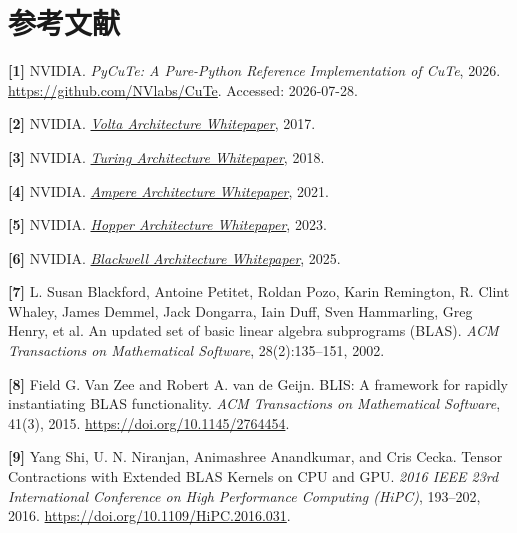\section*{参考文献}

\noindent\textbf{[1]} NVIDIA. \emph{PyCuTe: A Pure-Python Reference Implementation of CuTe}, 2026.
\url{https://github.com/NVlabs/CuTe}. Accessed: 2026-07-28.

\noindent\textbf{[2]} NVIDIA. \href{https://images.nvidia.com/content/volta-architecture/pdf/volta-architecture-whitepaper.pdf}{\emph{Volta Architecture Whitepaper}}, 2017.

\noindent\textbf{[3]} NVIDIA. \href{https://images.nvidia.com/aem-dam/en-zz/Solutions/design-visualization/technologies/turing-architecture/NVIDIA-Turing-Architecture-Whitepaper.pdf}{\emph{Turing Architecture Whitepaper}}, 2018.

\noindent\textbf{[4]} NVIDIA. \href{https://images.nvidia.com/aem-dam/en-zz/Solutions/data-center/nvidia-ampere-architecture-whitepaper.pdf}{\emph{Ampere Architecture Whitepaper}}, 2021.

\noindent\textbf{[5]} NVIDIA. \href{https://resources.nvidia.com/en-us-hopper-architecture/nvidia-h100-tensor-c}{\emph{Hopper Architecture Whitepaper}}, 2023.

\noindent\textbf{[6]} NVIDIA. \href{https://images.nvidia.com/aem-dam/Solutions/geforce/blackwell/nvidia-rtx-blackwell-gpu-architecture.pdf}{\emph{Blackwell Architecture Whitepaper}}, 2025.

\noindent\textbf{[7]} L. Susan Blackford, Antoine Petitet, Roldan Pozo, Karin Remington,
R. Clint Whaley, James Demmel, Jack Dongarra, Iain Duff, Sven Hammarling,
Greg Henry, et al. An updated set of basic linear algebra subprograms (BLAS).
\emph{ACM Transactions on Mathematical Software}, 28(2):135--151, 2002.

\noindent\textbf{[8]} Field G. Van Zee and Robert A. van de Geijn. BLIS: A framework for rapidly
instantiating BLAS functionality. \emph{ACM Transactions on Mathematical Software},
41(3), 2015. \url{https://doi.org/10.1145/2764454}.

\noindent\textbf{[9]} Yang Shi, U. N. Niranjan, Animashree Anandkumar, and Cris Cecka.
Tensor Contractions with Extended BLAS Kernels on CPU and GPU.
\emph{2016 IEEE 23rd International Conference on High Performance Computing (HiPC)},
193--202, 2016. \url{https://doi.org/10.1109/HiPC.2016.031}.

